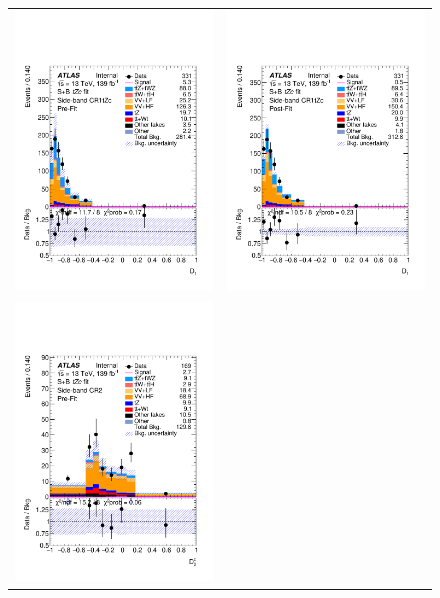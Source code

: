 \begin{figure}[htbp]
	\centering
	\begin{tabular}{cc}
		\includegraphics[width=.45\textwidth]{Chapters/CH8/figures/SPLUSB_CRSR_DL1rc_unblind/Plots/SBCR1} &
		\includegraphics[width=.45\textwidth]{Chapters/CH8/figures/SPLUSB_CRSR_DL1rc_unblind/Plots/SBCR1_postFit} \\
		\includegraphics[width=.45\textwidth]{Chapters/CH8/figures/SPLUSB_CRSR_DL1rc_unblind/Plots/SBCR2} &

\end{tabular}
\end{figure}
